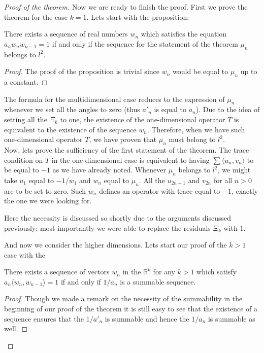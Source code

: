 \begin{proof}[Proof of the theorem]
        Now we are ready to finish the proof.
        First we prove the theorem for the case $k=1$. Lets start with the proposition:
        \begin{prop}
            There exists a sequence of real numbers $w_n$ which satisfies the equation $a_n w_n w_{n-1} = 1$ if and
            only if the sequence for the statement of the theorem $\mu_n$ belongs to $l^2$.
        \end{prop}
        \begin{proof}
            The proof of the proposition is trivial since $w_n$ would be equal to $\mu_n$ up to a constant.
        \end{proof}
        The formula for the multidimensional case reduces to the expression of $\mu_n$ whenever we
        set all the angles to zero (thus $a'_n$ is equal to $a_n$). Due to the idea of setting all the $\Xi_k$ to one,
        the existence of the one-dimensional operator $T$ is equivalent to the existence of the sequence $w_n$.
        Therefore, when we have such one-dimensional operator $T$, we have proven that $\mu_n$ must belong to $l^2$.\\
        
        Now, lets prove the sufficiency of the first statement of the theorem.
        The trace condition on $T$ in the one-dimensional case is 
        equivalent to having $\sum \langle u_n, v_n\rangle $ to be equal to $-1$ as we have already noted.
        Whenever $\mu_n$ belongs to $l^2$, we might take $u_1$ equal to $-1/w_1$ and $w_n$ equal to $\mu_n$.
        All the $u_{2n+1}$ and $v_{2n}$ for all $n>0$ are to be set to zero.
        Such $w_n$ defines an operator with trace equal to $-1$, exactly the one we were looking for.
        \begin{remark}
            Here the necessity is discussed so shortly due to the arguments discussed previously: most importantly we
            were able to replace the residuals $\Xi_k$ with $1$.
        \end{remark}
        \noindent And now we consider the higher dimensions. Lets start our proof of the $k > 1$ case with the 
        \begin{prop}
            There exists a sequence of vectors $w_n$ in the $\mathbb{R}^k$ for any $k > 1$ which satisfy $a_n \langle w_n, w_{n-1} \rangle = 1$ if and only if $1/a_n$ is a summable sequence.
        \end{prop}
        \begin{proof}
            Though we made a remark on the necessity of the summability
            in the beginning of our proof of the theorem it is still
            easy to see that the existence of a sequence ensures that the $1/a'_n$ is summable and hence
            the $1/a_n$ is summable as well.
            

\end{proof}
\end{proof}

